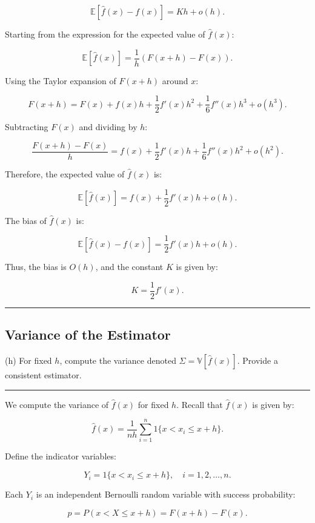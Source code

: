 \documentclass{article}
\newenvironment{colorparagraph}[1]{\par\color{#1}}{\par}
\begin{document}
\[
\mathbb{E}[\hat{f}(x) - f(x)] = K h + o(h).
\]

Starting from the expression for the expected value of \( \hat{f}(x) \):

\[
\mathbb{E}[\hat{f}(x)] = \frac{1}{h} \left( F(x + h) - F(x) \right).
\]

Using the Taylor expansion of \( F(x + h) \) around \( x \):

\[
F(x + h) = F(x) + f(x) h + \frac{1}{2} f'(x) h^2 + \frac{1}{6} f''(x) h^3 + o(h^3).
\]

Subtracting \( F(x) \) and dividing by \( h \):

\[
\frac{F(x + h) - F(x)}{h} = f(x) + \frac{1}{2} f'(x) h + \frac{1}{6} f''(x) h^2 + o(h^2).
\]

Therefore, the expected value of \( \hat{f}(x) \) is:

\[
\mathbb{E}[\hat{f}(x)] = f(x) + \frac{1}{2} f'(x) h + o(h).
\]

The bias of \( \hat{f}(x) \) is:

\[
\mathbb{E}[\hat{f}(x) - f(x)] = \frac{1}{2} f'(x) h + o(h).
\]

Thus, the bias is \( O(h) \), and the constant \( K \) is given by:

\[
K = \frac{1}{2} f'(x).
\]

\begin{colorparagraph}{questioncolor}
\label{q2h}
\rule{\textwidth}{0.5pt}
\subsection{Variance of the Estimator}
(h) For fixed \( h \), compute the variance denoted \( \Sigma = \mathbb{V}[\hat{f}(x)] \). Provide a consistent estimator.

\rule{\textwidth}{0.5pt}
\end{colorparagraph}

We compute the variance of \( \hat{f}(x) \) for fixed \( h \). Recall that \( \hat{f}(x) \) is given by:

\[
\hat{f}(x) = \frac{1}{n h} \sum_{i=1}^n 1\{ x < x_i \leq x + h \}.
\]

Define the indicator variables:

\[
Y_i = 1\{ x < x_i \leq x + h \}, \quad i = 1, 2, \dots, n.
\]

Each \( Y_i \) is an independent Bernoulli random variable with success probability:

\[
p = P(x < X \leq x + h) = F(x + h) - F(x).
\]
\end{document}
